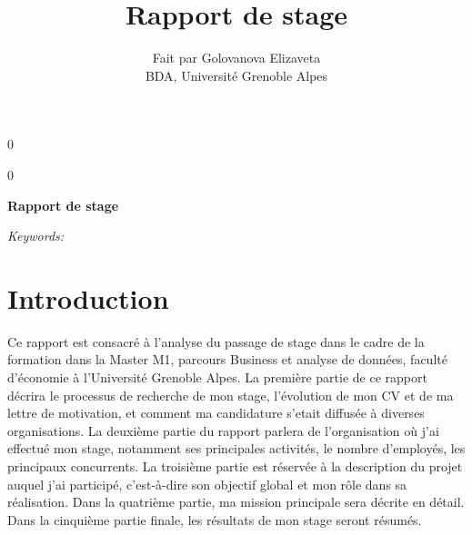 \documentclass[12pt]{article}
\newcommand{\blind}{0}
\begin{document}
\def\spacingset#1{\renewcommand{\baselinestretch}%
{#1}\small\normalsize} \spacingset{1}



\blind
{
  \title{\bf Rapport de stage}

  \author{
        Fait par Golovanova Elizaveta \\
    BDA, Université Grenoble Alpes\\
      }
  \maketitle
} \fi

\blind
{
  \bigskip
  \bigskip
  \bigskip
  \begin{center}
    {\LARGE\bf Rapport de stage}
  \end{center}
  \medskip
} \fi

\bigskip
\begin{abstract}

\end{abstract}

\noindent%
{\it Keywords:} 
\vfill

\newpage
\spacingset{1.45} %

\newpage
\tableofcontents 
\newpage

\hypertarget{introduction}{%
\section{Introduction}\label{introduction}}

Ce rapport est consacré à l'analyse du passage de stage dans le cadre de
la formation dans la Master M1, parcours Business et analyse de données,
faculté d'économie à l'Université Grenoble Alpes. La première partie de
ce rapport décrira le processus de recherche de mon stage, l'évolution
de mon CV et de ma lettre de motivation, et comment ma candidature
s'etait diffusée à diverses organisations. La deuxième partie du rapport
parlera de l'organisation où j'ai effectué mon stage, notamment ses
principales activités, le nombre d'employés, les principaux concurrents.
La troisième partie est réservée à la description du projet auquel j'ai
participé, c'est-à-dire son objectif global et mon rôle dans sa
réalisation. Dans la quatrième partie, ma mission principale sera
décrite en détail. Dans la cinquième partie finale, les résultats de mon
stage seront résumés.
\end{document}
